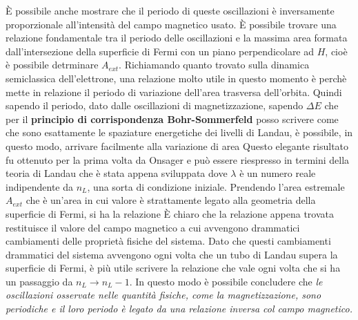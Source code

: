 \`E possibile anche mostrare che il periodo di queste oscillazioni \`e inversamente proporzionale all'intensit\`a del campo magnetico usato. \`E possibile trovare una relazione fondamentale tra il periodo delle oscillazioni e la massima area formata dall'intersezione della superficie di Fermi con un piano perpendicolare ad $H$, cio\`e \`e possibile detrminare $A_{ext}$. Richiamando quanto trovato sulla dinamica semiclassica dell'elettrone, una relazione molto utile in questo momento \`e
perch\`e mette in relazione il periodo di variazione dell'area trasversa dell'orbita. Quindi sapendo il periodo, dato dalle oscillazioni di magnetizzazione, sapendo $\Delta E$ che per il \textbf{principio di corrispondenza Bohr-Sommerfeld} posso scrivere come
che sono esattamente le spaziature energetiche dei livelli di Landau, \`e possibile, in questo modo, arrivare facilmente alla variazione di area
Questo elegante risultato fu ottenuto per la prima volta da Onsager e pu\`o essere riespresso in termini della teoria di Landau che \`e stata appena sviluppata
dove $\lambda$ \`e un numero reale indipendente da $n_L$, una sorta di condizione iniziale. Prendendo l'area estremale $A_{ext}$ che \`e un'area in cui valore \`e strattamente legato alla geometria della superficie di Fermi, si ha la relazione
\`E chiaro che la relazione appena trovata restituisce il valore del campo magnetico a cui avvengono drammatici cambiamenti delle propriet\`a fisiche del sistema. Dato che questi cambiamenti drammatici del sistema avvengono ogni volta che un tubo di Landau supera la superficie di Fermi, \`e pi\`u utile scrivere la relazione
che vale ogni volta che si ha un passaggio da $n_L \to n_L-1$. In questo modo \`e possibile concludere che \textit{le oscillazioni osservate nelle quantit\`a fisiche, come la magnetizzazione, sono periodiche e il loro periodo \`e legato da una relazione inversa col campo magnetico.}







